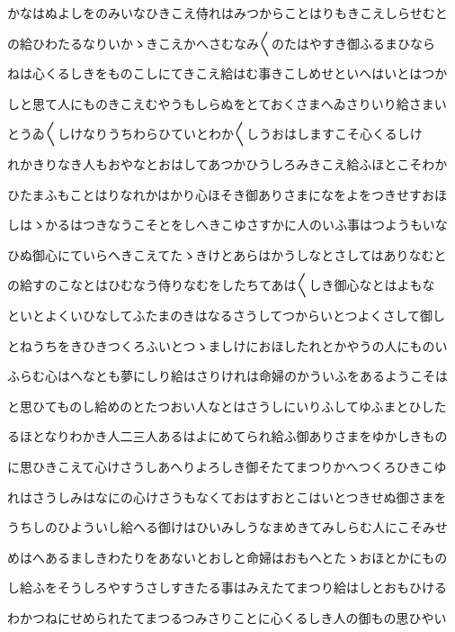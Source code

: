 \documentclass[a4paper,11pt,landscape]{ltjtarticle}
\begin{document}
\par\medskip
かなはぬよしをのみいなひきこえ侍れはみつからことはりもきこえしらせむと
\par\medskip
の給ひわたるなりいかゝきこえかへさむなみ〱のたはやすき御ふるまひなら
\par\medskip
ねは心くるしきをものこしにてきこえ給はむ事きこしめせといへはいとはつか
\par\medskip
しと思て人にものきこえむやうもしらぬをとておくさまへゐさりいり給さまい
\par\medskip
とうゐ〱しけなりうちわらひていとわか〱しうおはしますこそ心くるしけ
\par\medskip
れかきりなき人もおやなとおはしてあつかひうしろみきこえ給ふほとこそわか
\par\medskip
ひたまふもことはりなれかはかり心ほそき御ありさまになをよをつきせすおほ
\par\medskip
しはゝかるはつきなうこそとをしへきこゆさすかに人のいふ事はつようもいな
\par\medskip
ひぬ御心にていらへきこえてたゝきけとあらはかうしなとさしてはありなむと
\par\medskip
の給すのこなとはひむなう侍りなむをしたちてあは〱しき御心なとはよもな
\par\medskip
といとよくいひなしてふたまのきはなるさうしてつからいとつよくさして御し
\par\medskip
とねうちをきひきつくろふいとつゝましけにおほしたれとかやうの人にものい
\par\medskip
ふらむ心はへなとも夢にしり給はさりけれは命婦のかういふをあるようこそは
\par\medskip
と思ひてものし給めのとたつおい人なとはさうしにいりふしてゆふまとひした
\par\medskip
るほとなりわかき人二三人あるはよにめてられ給ふ御ありさまをゆかしきもの
\par\medskip
に思ひきこえて心けさうしあへりよろしき御そたてまつりかへつくろひきこゆ
\par\medskip
れはさうしみはなにの心けさうもなくておはすおとこはいとつきせぬ御さまを
\par\medskip
うちしのひよういし給へる御けはひいみしうなまめきてみしらむ人にこそみせ
\par\medskip
めはへあるましきわたりをあないとおしと命婦はおもへとたゝおほとかにもの
\par\medskip
し給ふをそうしろやすうさしすきたる事はみえたてまつり給はしとおもひける
\par\medskip
わかつねにせめられたてまつるつみさりことに心くるしき人の御もの思ひやい
\par\medskip
\end{document}
